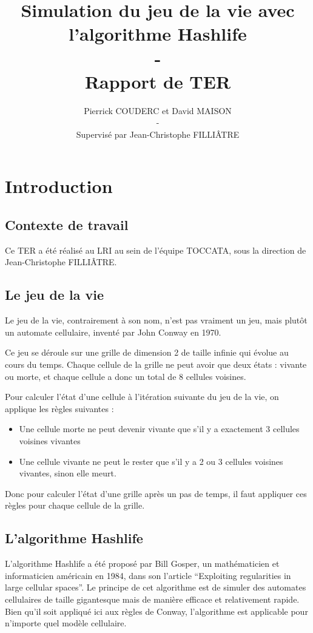\documentclass[a4paper,12pt]{report}
\title{
  \textbf{Simulation du jeu de la vie avec l'algorithme Hashlife}
  \\ - \\
  Rapport de TER}
\author{Pierrick COUDERC et David MAISON
\\ - \\
Supervisé par Jean-Christophe FILLIÂTRE}
\begin{document}
\maketitle
\tableofcontents





\chapter{Introduction}\label{chap:intro}



\section{Contexte de travail}

Ce TER a été réalisé au LRI au sein de l'équipe TOCCATA, sous la direction de
Jean-Christophe FILLIÂTRE.

\section{Le jeu de la vie}
Le jeu de la vie, contrairement à son nom, n'est pas vraiment un jeu,
mais plutôt un automate cellulaire, inventé par John Conway en 1970.

Ce jeu se déroule sur une grille de dimension 2 de taille infinie qui évolue au
cours du temps.  Chaque cellule de la grille ne peut avoir que deux états :
vivante ou morte, et chaque cellule a donc un total de 8 cellules voisines.

Pour calculer l'état d'une cellule à l'itération suivante du jeu de la
vie, on applique les règles suivantes :
\begin{itemize}
\item Une cellule morte ne peut devenir vivante que s'il y a
  exactement 3 cellules voisines vivantes
\item Une cellule vivante ne peut le rester que s'il y a 2 ou 3
  cellules voisines vivantes, sinon elle meurt.
\end{itemize}
Donc pour calculer l'état d'une grille après un pas de temps, il faut
appliquer ces règles pour chaque cellule de la grille.



\section{L'algorithme Hashlife}\label{section:hashlife}

L'algorithme Hashlife a été proposé par Bill Gosper, un mathématicien et
informaticien américain en 1984, dans son l'article ``Exploiting regularities in
large cellular spaces''. Le principe de cet algorithme est de simuler des
automates cellulaires de taille gigantesque mais de manière efficace et
relativement rapide. Bien qu'il soit appliqué ici aux règles de Conway,
l'algorithme est applicable pour n'importe quel modèle cellulaire.
\end{document}
